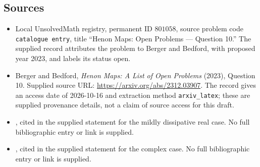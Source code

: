 \documentclass[11pt]{article}
\begin{document}
\subsection{Sources}
\begin{itemize}
\item Local UnsolvedMath registry, permanent ID \(801058\), source problem code \texttt{catalogue entry}, title ``Henon Maps: Open Problems --- Question 10.'' The supplied record attributes the problem to Berger and Bedford, with proposed year 2023, and labels its status open.
\item Berger and Bedford, \emph{Henon Maps: A List of Open Problems} (2023), Question 10. Supplied source URL: \url{https://arxiv.org/abs/2312.03907}. The record gives an access date of 2026-10-16 and extraction method \texttt{arxiv\_latex}; these are supplied provenance details, not a claim of source access for this draft.
\item [CP], cited in the supplied statement for the mildly dissipative real case. No full bibliographic entry or link is supplied.
\item [MR4142445], cited in the supplied statement for the complex case. No full bibliographic entry or link is supplied.
\end{itemize}
\end{document}
